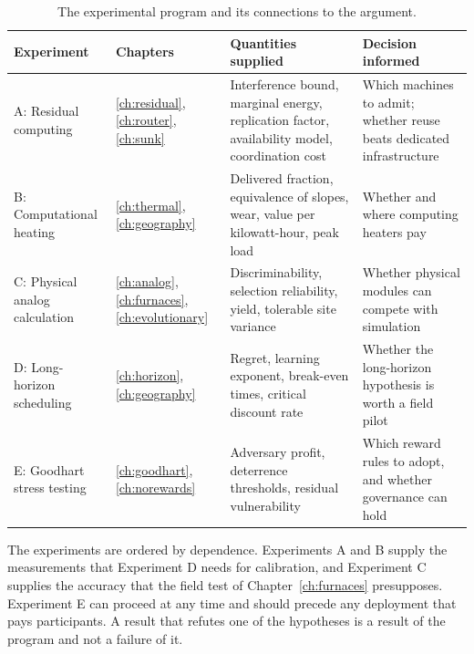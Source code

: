 \begin{table}[ht]
\centering
\small
\begin{tabular}{>{\raggedright\arraybackslash}p{0.9in}>{\raggedright\arraybackslash}p{1.0in}>{\raggedright\arraybackslash}p{1.9in}>{\raggedright\arraybackslash}p{1.5in}}
\toprule
Experiment & Chapters & Quantities supplied & Decision informed \\
\midrule
A: Residual computing & \ref{ch:residual}, \ref{ch:router}, \ref{ch:sunk} & Interference bound, marginal energy, replication factor, availability model, coordination cost & Which machines to admit; whether reuse beats dedicated infrastructure \\
B: Computational heating & \ref{ch:thermal}, \ref{ch:geography} & Delivered fraction, equivalence of slopes, wear, value per kilowatt-hour, peak load & Whether and where computing heaters pay \\
C: Physical analog calculation & \ref{ch:analog}, \ref{ch:furnaces}, \ref{ch:evolutionary} & Discriminability, selection reliability, yield, tolerable site variance & Whether physical modules can compete with simulation \\
D: Long-horizon scheduling & \ref{ch:horizon}, \ref{ch:geography} & Regret, learning exponent, break-even times, critical discount rate & Whether the long-horizon hypothesis is worth a field pilot \\
E: Goodhart stress testing & \ref{ch:goodhart}, \ref{ch:norewards} & Adversary profit, deterrence thresholds, residual vulnerability & Which reward rules to adopt, and whether governance can hold \\
\bottomrule
\end{tabular}
\caption{The experimental program and its connections to the argument.}
\label{tab:program}
\end{table}

The experiments are ordered by dependence. Experiments A and B supply the measurements that Experiment D needs for calibration, and Experiment C supplies the accuracy that the field test of Chapter~\ref{ch:furnaces} presupposes. Experiment E can proceed at any time and should precede any deployment that pays participants. A result that refutes one of the hypotheses is a result of the program and not a failure of it.
